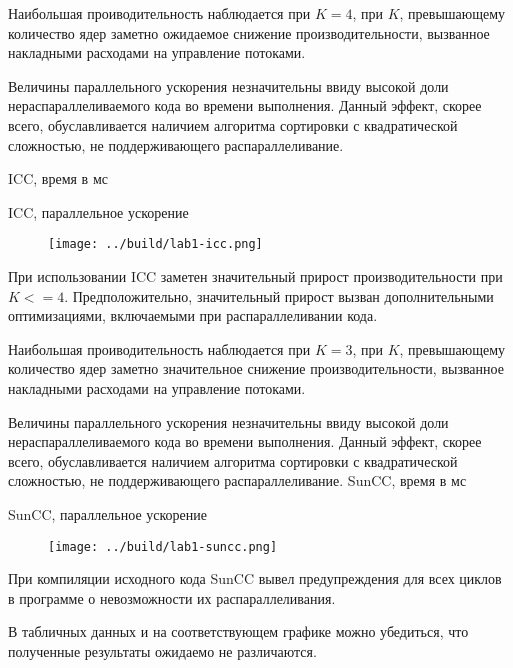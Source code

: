 \documentclass[14pt, a4paper, oneside, final]{extarticle}
\begin{document}
Наибольшая проиводительность наблюдается при $K=4$, при $K$, превышающему количество ядер заметно ожидаемое снижение производительности, вызванное накладными расходами на управление потоками.

Величины параллельного ускорения незначительны ввиду высокой доли нераспараллеливаемого кода во времени выполнения. Данный эффект, скорее всего, обуславливается наличием алгоритма сортировки с квадратической сложностью, не поддерживающего распараллеливание.

\clearpage
ICC, время в мс


ICC, параллельное ускорение



\begin{figure}[ht!]

\texttt{[image: ../build/lab1-icc.png]}
\end{figure}

При использовании ICC заметен значительный прирост производительности при $K<=4$. Предположительно, значительный прирост вызван дополнительными оптимизациями, включаемыми при распараллеливании кода.

Наибольшая проиводительность наблюдается при $K=3$, при $K$, превышающему количество ядер заметно значительное снижение производительности, вызванное накладными расходами на управление потоками.

Величины параллельного ускорения незначительны ввиду высокой доли нераспараллеливаемого кода во времени выполнения. Данный эффект, скорее всего, обуславливается наличием алгоритма сортировки с квадратической сложностью, не поддерживающего распараллеливание.
\clearpage
SunCC, время в мс


SunCC, параллельное ускорение


\begin{figure}[ht!]

\texttt{[image: ../build/lab1-suncc.png]}
\end{figure}

При компиляции исходного кода SunCC вывел предупреждения для всех циклов в программе о невозможности их распараллеливания.

В табличных данных и на соответствующем графике можно убедиться, что полученные результаты ожидаемо не различаются.
\end{document}
